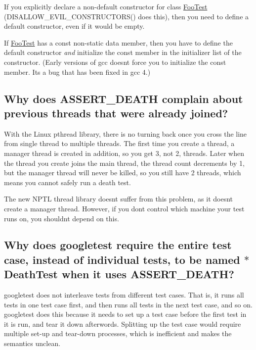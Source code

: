 \begin{DoxyItemize}
\item If you explicitly declare a non-\/default constructor for class {\ttfamily \mbox{\hyperlink{classFooTest}{Foo\+Test}}} ({\ttfamily D\+I\+S\+A\+L\+L\+O\+W\+\_\+\+E\+V\+I\+L\+\_\+\+C\+O\+N\+S\+T\+R\+U\+C\+T\+O\+R\+S()} does this), then you need to define a default constructor, even if it would be empty.
\item If {\ttfamily \mbox{\hyperlink{classFooTest}{Foo\+Test}}} has a const non-\/static data member, then you have to define the default constructor {\itshape and} initialize the const member in the initializer list of the constructor. (Early versions of {\ttfamily gcc} doesn\textquotesingle{}t force you to initialize the const member. It\textquotesingle{}s a bug that has been fixed in {\ttfamily gcc 4}.)
\end{DoxyItemize}

\subsection*{Why does A\+S\+S\+E\+R\+T\+\_\+\+D\+E\+A\+TH complain about previous threads that were already joined?}

With the Linux pthread library, there is no turning back once you cross the line from single thread to multiple threads. The first time you create a thread, a manager thread is created in addition, so you get 3, not 2, threads. Later when the thread you create joins the main thread, the thread count decrements by 1, but the manager thread will never be killed, so you still have 2 threads, which means you cannot safely run a death test.

The new N\+P\+TL thread library doesn\textquotesingle{}t suffer from this problem, as it doesn\textquotesingle{}t create a manager thread. However, if you don\textquotesingle{}t control which machine your test runs on, you shouldn\textquotesingle{}t depend on this.

\subsection*{Why does googletest require the entire test case, instead of individual tests, to be named $\ast$\+Death\+Test when it uses A\+S\+S\+E\+R\+T\+\_\+\+D\+E\+A\+TH?}

googletest does not interleave tests from different test cases. That is, it runs all tests in one test case first, and then runs all tests in the next test case, and so on. googletest does this because it needs to set up a test case before the first test in it is run, and tear it down afterwords. Splitting up the test case would require multiple set-\/up and tear-\/down processes, which is inefficient and makes the semantics unclean.

